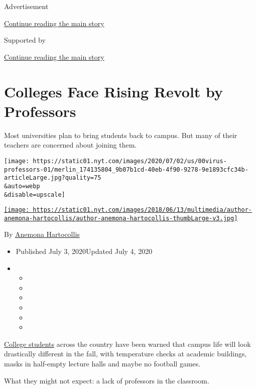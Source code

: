 Advertisement

\protect\hyperlink{after-top}{Continue reading the main story}

Supported by

\protect\hyperlink{after-sponsor}{Continue reading the main story}

\hypertarget{colleges-face-rising-revolt-by-professors}{%
\section{Colleges Face Rising Revolt by
Professors}\label{colleges-face-rising-revolt-by-professors}}

Most universities plan to bring students back to campus. But many of
their teachers are concerned about joining them.

\texttt{[image: https://static01.nyt.com/images/2020/07/02/us/00virus-professors-01/merlin\_174135804\_9b07b1cd-40eb-4f90-9278-9e1893cfc34b-articleLarge.jpg?quality=75\\\&auto=webp\\\&disable=upscale]}

\href{https://www.nytimes.com/by/anemona-hartocollis}{\texttt{[image: https://static01.nyt.com/images/2018/06/13/multimedia/author-anemona-hartocollis/author-anemona-hartocollis-thumbLarge-v3.jpg]}}

By \href{https://www.nytimes.com/by/anemona-hartocollis}{Anemona
Hartocollis}

\begin{itemize}
\item
  Published July 3, 2020Updated July 4, 2020
\item
  \begin{itemize}
  \item
  \item
  \item
  \item
  \item
  \item
  \end{itemize}
\end{itemize}

\href{https://www.nytimes.com/2020/07/03/your-money/students-unemployment-insurance-coronavirus.html}{College
students} across the country have been warned that campus life will look
drastically different in the fall, with temperature checks at academic
buildings, masks in half-empty lecture halls and maybe no football
games.

What they might not expect: a lack of professors in the classroom.

